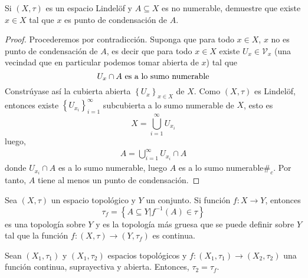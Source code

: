 \documentclass[12pt]{report}
\theoremstyle{largebreak}
\newcommand\cf[3]{\ensuremath{#1:#2\rightarrow#3}}
\newcommand\contradiction{\ensuremath{\#_c}}
\begin{document}
    \begin{excer}
        Si $(X,\tau)$ es un espacio Lindelöf y $A\subseteq X$ es no numerable, demuestre que existe $x\in X$ tal que $x$ es punto de condensación de $A$.
    \end{excer}

    \begin{proof}
        Procederemos por contradicción. Suponga que para todo $x\in X$, $x$ no es punto de condensación de $A$, es decir que para todo $x\in X$ existe $U_x\in\mathcal{V}_x$ (una vecindad que en particular podemos tomar abierta de $x$) tal que
        \begin{equation*}
            U_x\cap A\textup{ es a lo sumo numerable}
        \end{equation*}
        Constrúyase así la cubierta abierta $\left\{U_x\right\}_{x\in X}$ de $X$. Como $(X,\tau)$ es Lindelöf, entonces existe $\left\{U_{x_i} \right\}_{ i=1}^\infty$ subcubierta a lo sumo numerable de $X$, esto es
        \begin{equation*}
            X=\bigcup_{ i=1}^\infty U_{ x_i}
        \end{equation*}
        luego,
        \begin{equation*}
            \begin{split}
                A=\bigcup_{i=1}^\infty U_{x_i}\cap A
            \end{split}
        \end{equation*}
        donde $U_{ x_i}\cap A$ es a lo sumo numerable, luego $A$ es a lo sumo numerable\contradiction. Por tanto, $A$ tiene al menos un punto de condensación.
    \end{proof}

    \begin{mydef}
        Sea $(X,\tau)$ un espacio topológico y $Y$ un conjunto. Si función $\cf{f}{X}{Y}$, entonces
        \begin{equation*}
            \tau_f=\left\{A\subseteq Y\Big|f^{-1}(A)\in\tau \right\}
        \end{equation*}  
        es una topología sobre $Y$ y es la topología más gruesa que se puede definir sobre $Y$ tal que la función $\cf{f}{(X,\tau)}{(Y,\tau_f)}$ es continua.
    \end{mydef}
    
    \begin{excer}
        Sean $(X_1,\tau_1)$ y $(X_1,\tau_2)$ espacios topológicos y $\cf{f}{(X_1,\tau_1)}{(X_2,\tau_2)}$ una función continua, suprayectiva y abierta. Entonces, $\tau_2=\tau_f$.
    \end{excer}
\end{document}

